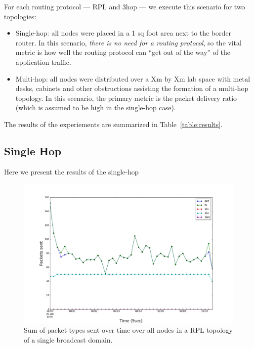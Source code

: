 For each routing protocol --- RPL and 3hop --- we execute this scenario for two topologies:
\begin{itemize}
\item Single-hop: all nodes were placed in a 1 sq foot area next to the border router.
In this scenario, \emph{there is no need for a routing protocol}, so the vital metric is how well the routing protocol can ``get out of the way'' of the application traffic.
\item Multi-hop: all nodes were distributed over a Xm by Xm lab space with metal desks, cabinets and other obstructions assisting the formation of a multi-hop topology.
In this scenario, the primary metric is the packet delivery ratio (which is assumed to be high in the single-hop case).
\end{itemize}

The results of the experiements are summarized in Table~\ref{table:results}.

\subsection{Single Hop}

Here we present the results of the single-hop 

\begin{figure}[t]
\centering
\includegraphics[width=\linewidth]{figs/rpl_single_hop.png}
\caption{Sum of packet types sent over time over all nodes in a RPL topology of a single broadcast domain.}
\label{fig:rpl_single_hop}
\end{figure}

